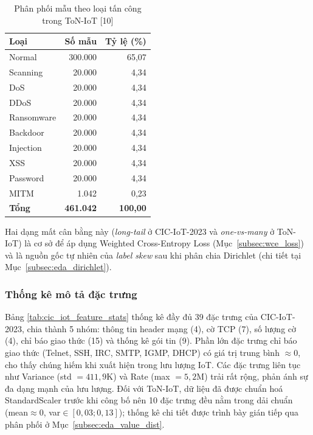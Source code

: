 \begin{table}[H]
\centering
\caption{Phân phối mẫu theo loại tấn công trong ToN-IoT {[}10{]}}
\label{tab:ton_iot_class_dist}
\small
\begin{tabular}{|l|r|r|}
\hline
\textbf{Loại} & \textbf{Số mẫu} & \textbf{Tỷ lệ (\%)} \\
\hline
Normal & 300.000 & 65,07 \\
\hline
Scanning & 20.000 & 4,34 \\
\hline
DoS & 20.000 & 4,34 \\
\hline
DDoS & 20.000 & 4,34 \\
\hline
Ransomware & 20.000 & 4,34 \\
\hline
Backdoor & 20.000 & 4,34 \\
\hline
Injection & 20.000 & 4,34 \\
\hline
XSS & 20.000 & 4,34 \\
\hline
Password & 20.000 & 4,34 \\
\hline
MITM & 1.042 & 0,23 \\
\hline
\textbf{Tổng} & \textbf{461.042} & \textbf{100,00} \\
\hline
\end{tabular}
\end{table}

Hai dạng mất cân bằng này (\textit{long-tail} ở CIC-IoT-2023 và \textit{one-vs-many} ở ToN-IoT) là cơ sở để áp dụng Weighted Cross-Entropy Loss (Mục~\ref{subsec:wce_loss}) và là nguồn gốc tự nhiên của \textit{label skew} sau khi phân chia Dirichlet (chi tiết tại Mục~\ref{subsec:eda_dirichlet}).

\subsubsection{Thống kê mô tả đặc trưng}
Bảng \ref{tab:cic_iot_feature_stats} thống kê đầy đủ 39 đặc trưng của CIC-IoT-2023, chia thành 5 nhóm: thông tin header mạng (4), cờ TCP (7), số lượng cờ (4), chỉ báo giao thức (15) và thống kê gói tin (9). Phần lớn đặc trưng chỉ báo giao thức (Telnet, SSH, IRC, SMTP, IGMP, DHCP) có giá trị trung bình $\approx 0$, cho thấy chúng hiếm khi xuất hiện trong lưu lượng IoT. Các đặc trưng liên tục như Variance (std $= 411{,}9$K) và Rate (max $= 5{,}2$M) trải rất rộng, phản ánh sự đa dạng mạnh của lưu lượng. Đối với ToN-IoT, dữ liệu đã được chuẩn hoá StandardScaler trước khi công bố nên 10 đặc trưng đều nằm trong dải chuẩn (mean$\approx$0, var$\in[0{,}03; 0{,}13]$); thống kê chi tiết được trình bày gián tiếp qua phân phối ở Mục~\ref{subsec:eda_value_dist}.

